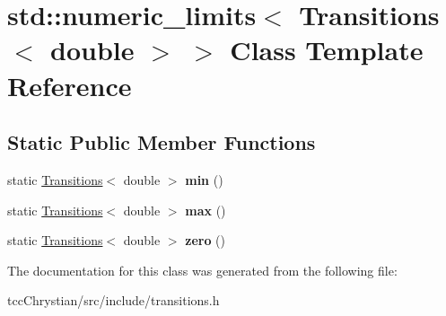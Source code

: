 \hypertarget{classstd_1_1numeric__limits_3_01Transitions_3_01double_01_4_01_4}{\section{std\-:\-:numeric\-\_\-limits$<$ Transitions$<$ double $>$ $>$ Class Template Reference}
\label{classstd_1_1numeric__limits_3_01Transitions_3_01double_01_4_01_4}
}
\subsection*{Static Public Member Functions}
\begin{DoxyCompactItemize}
\item 
\hypertarget{classstd_1_1numeric__limits_3_01Transitions_3_01double_01_4_01_4_aaf2bf171cb5f11b864b09798f6d63460}{static \hyperlink{classTransitions}{Transitions}$<$ double $>$ {\bfseries min} ()}\label{classstd_1_1numeric__limits_3_01Transitions_3_01double_01_4_01_4_aaf2bf171cb5f11b864b09798f6d63460}

\item 
\hypertarget{classstd_1_1numeric__limits_3_01Transitions_3_01double_01_4_01_4_aac0b30f8990c636cda3f083b95e626a4}{static \hyperlink{classTransitions}{Transitions}$<$ double $>$ {\bfseries max} ()}\label{classstd_1_1numeric__limits_3_01Transitions_3_01double_01_4_01_4_aac0b30f8990c636cda3f083b95e626a4}

\item 
\hypertarget{classstd_1_1numeric__limits_3_01Transitions_3_01double_01_4_01_4_ab17fbee311d6e67204ca678d02ba1e80}{static \hyperlink{classTransitions}{Transitions}$<$ double $>$ {\bfseries zero} ()}\label{classstd_1_1numeric__limits_3_01Transitions_3_01double_01_4_01_4_ab17fbee311d6e67204ca678d02ba1e80}

\end{DoxyCompactItemize}


The documentation for this class was generated from the following file\-:\begin{DoxyCompactItemize}
\item 
tcc\-Chrystian/src/include/transitions.\-h\end{DoxyCompactItemize}
